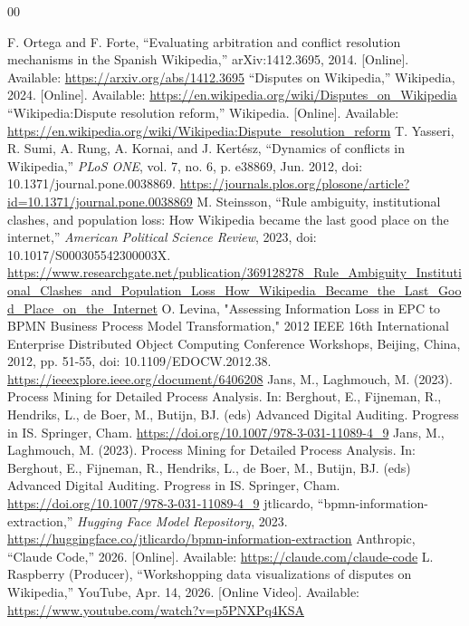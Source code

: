 \documentclass[conference]{IEEEtran}
\begin{document}
\begin{thebibliography}{00}

 F. Ortega and F. Forte, ``Evaluating arbitration and conflict resolution mechanisms in the Spanish Wikipedia,'' arXiv:1412.3695, 2014. [Online]. Available: \url{https://arxiv.org/abs/1412.3695}
 ``Disputes on Wikipedia,'' Wikipedia, 2024. [Online]. Available: \url{https://en.wikipedia.org/wiki/Disputes_on_Wikipedia}
 ``Wikipedia:Dispute resolution reform,'' Wikipedia. [Online]. Available: \url{https://en.wikipedia.org/wiki/Wikipedia:Dispute_resolution_reform}
 T. Yasseri, R. Sumi, A. Rung, A. Kornai, and J. Kertész, ``Dynamics of conflicts in Wikipedia,'' \textit{PLoS ONE}, vol. 7, no. 6, p. e38869, Jun. 2012, doi: 10.1371/journal.pone.0038869. \url{https://journals.plos.org/plosone/article?id=10.1371/journal.pone.0038869}
 M. Steinsson, ``Rule ambiguity, institutional clashes, and population loss: How Wikipedia became the last good place on the internet,'' \textit{American Political Science Review}, 2023, doi: 10.1017/S000305542300003X. \url{https://www.researchgate.net/publication/369128278_Rule_Ambiguity_Institutional_Clashes_and_Population_Loss_How_Wikipedia_Became_the_Last_Good_Place_on_the_Internet}
 O. Levina, "Assessing Information Loss in EPC to BPMN Business Process Model Transformation," 2012 IEEE 16th International Enterprise Distributed Object Computing Conference Workshops, Beijing, China, 2012, pp. 51-55, doi: 10.1109/EDOCW.2012.38. \url{https://ieeexplore.ieee.org/document/6406208}
 Jans, M., Laghmouch, M. (2023). Process Mining for Detailed Process Analysis. In: Berghout, E., Fijneman, R., Hendriks, L., de Boer, M., Butijn, BJ. (eds) Advanced Digital Auditing. Progress in IS. Springer, Cham. \url{https://doi.org/10.1007/978-3-031-11089-4\_9}
 Jans, M., Laghmouch, M. (2023). Process Mining for Detailed Process Analysis. In: Berghout, E., Fijneman, R., Hendriks, L., de Boer, M., Butijn, BJ. (eds) Advanced Digital Auditing. Progress in IS. Springer, Cham. \url{https://doi.org/10.1007/978-3-031-11089-4\_9}
 jtlicardo, ``bpmn-information-extraction,'' \textit{Hugging Face Model Repository}, 2023. \url{https://huggingface.co/jtlicardo/bpmn-information-extraction}
 Anthropic, ``Claude Code,'' 2026. [Online]. Available: \url{https://claude.com/claude-code}
 L. Raspberry (Producer), ``Workshopping data visualizations of disputes on Wikipedia,'' YouTube, Apr. 14, 2026. [Online Video]. Available: \url{https://www.youtube.com/watch?v=p5PNXPq4KSA}
\end{thebibliography}
\end{document}

